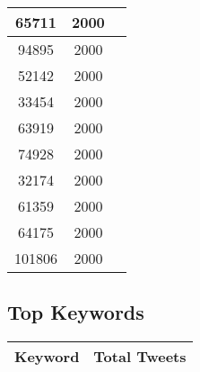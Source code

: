 \documentclass{article}\usepackage[T1]{fontenc}
\begin{document}
\begin{tabular}{|c|c|c|}
 \hline
65711 & 2000\\ 
 \hline
94895 & 2000\\ 
 \hline
52142 & 2000\\ 
 \hline
33454 & 2000\\ 
 \hline
63919 & 2000\\ 
 \hline
74928 & 2000\\ 
 \hline
32174 & 2000\\ 
 \hline
61359 & 2000\\ 
 \hline
64175 & 2000\\ 
 \hline
101806 & 2000\\ 
 \hline
\end{tabular}\subsection*{Top Keywords}\begin{tabular}{|c|c|}         \hline         Keyword & Total Tweets \\ 
 \hline
\end{tabular}
\end{document}
